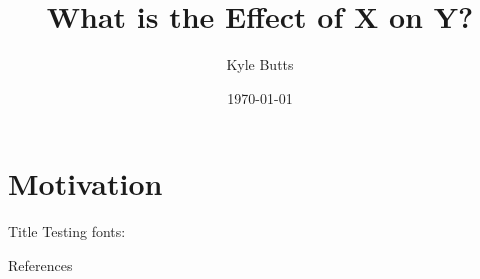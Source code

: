 \documentclass[aspectratio=169,t]{beamer}
\title{What is the Effect of X on Y?}
\date{\today}
\author{Kyle Butts}
\begin{document}
\begin{frame}
\maketitle

\end{frame}

\section{Motivation}

\begin{frame}{Title}
  Testing fonts: \citet{Fajgelbaum_Morales_Serrato_Zidar_2018}
\end{frame}


\begin{frame}[allowframebreaks]{References}
  \printbibliography
\end{frame}
\appendix
\end{document}
